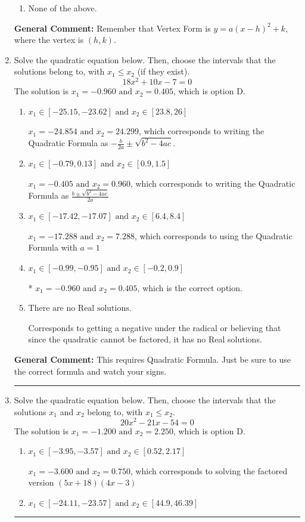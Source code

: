 \documentclass{extbook}[14pt]
\newcommand{\litem}[1]{\item #1

\rule{\textwidth}{0.4pt}}
\begin{document}
\begin{enumerate}
{\begin{enumerate}[label=\Alph*.]
\begin{multicols}{2}
\end{multicols}\item None of the above.\end{enumerate}
\textbf{General Comment:} Remember that Vertex Form is $y = a(x-h)^2+k$, where the vertex is $(h, k)$.
}
\litem{
Solve the quadratic equation below. Then, choose the intervals that the solutions belong to, with $x_1 \leq x_2$ (if they exist).
\[ 18x^{2} +10 x -7 = 0 \]The solution is \( x_1 = -0.960 \text{ and } x_2 = 0.405 \), which is option D.\begin{enumerate}[label=\Alph*.]
\item \( x_1 \in [-25.15, -23.62] \text{ and } x_2 \in [23.8, 26] \)

 $x_1 = -24.854 \text{ and } x_2 = 24.299$, which corresponds to writing the Quadratic Formula as $-\frac{b}{2a} \pm \sqrt{b^2 - 4ac}$.
\item \( x_1 \in [-0.79, 0.13] \text{ and } x_2 \in [0.9, 1.5] \)

 $x_1 = -0.405 \text{ and } x_2 = 0.960$, which corresponds to writing the Quadratic Formula as $\frac{b \pm \sqrt{b^2 - 4ac}}{2a}$
\item \( x_1 \in [-17.42, -17.07] \text{ and } x_2 \in [6.4, 8.4] \)

 $x_1 = -17.288 \text{ and } x_2 = 7.288$, which corresponds to using the Quadratic Formula with $a=1$
\item \( x_1 \in [-0.99, -0.95] \text{ and } x_2 \in [-0.2, 0.9] \)

* $x_1 = -0.960 \text{ and } x_2 = 0.405$, which is the correct option.
\item \( \text{There are no Real solutions.} \)

Corresponds to getting a negative under the radical or believing that since the quadratic cannot be factored, it has no Real solutions.
\end{enumerate}

\textbf{General Comment:} This requires Quadratic Formula. Just be sure to use the correct formula and watch your signs.
}
\litem{
Solve the quadratic equation below. Then, choose the intervals that the solutions $x_1$ and $x_2$ belong to, with $x_1 \leq x_2$.
\[ 20x^{2} -21 x -54 = 0 \]The solution is \( x_1 = -1.200 \text{ and } x_2 = 2.250 \), which is option D.\begin{enumerate}[label=\Alph*.]
\item \( x_1 \in [-3.95, -3.57] \text{ and } x_2 \in [0.52, 2.17] \)

$x_1 = -3.600 \text{ and } x_2 = 0.750$, which corresponds to solving the factored version $(5x + 18)(4x -3)$
\item \( x_1 \in [-24.11, -23.57] \text{ and } x_2 \in [44.9, 46.39] \)


\end{enumerate}}
\end{enumerate}
\end{document}
